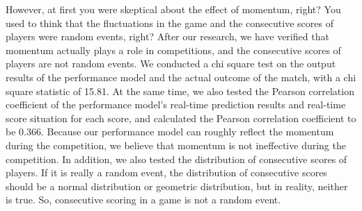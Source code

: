 \documentclass{mcmthesis}
\begin{document}
However, at first you were skeptical about the effect of momentum, right? You used to think that the fluctuations in the game and the consecutive scores of players were random events, right? After our research, we have verified that momentum actually plays a role in competitions, and the consecutive scores of players are not random events. We conducted a chi square test on the output results of the performance model and the actual outcome of the match, with a chi square statistic of 15.81. At the same time, we also tested the Pearson correlation coefficient of the performance model's real-time prediction results and real-time score situation for each score, and calculated the Pearson correlation coefficient to be 0.366. Because our performance model can roughly reflect the momentum during the competition, we believe that momentum is not ineffective during the competition. In addition, we also tested the distribution of consecutive scores of players. If it is really a random event, the distribution of consecutive scores should be a normal distribution or geometric distribution, but in reality, neither is true. So, consecutive scoring in a game is not a random event.   
\end{document}

